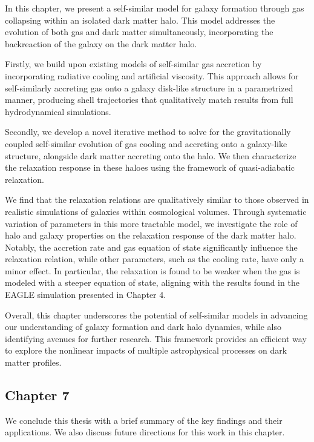 \documentclass[a4paper, 12pt, oneside]{Thesis}  %
\begin{document}
In this chapter, we present a self-similar model for galaxy formation through gas collapsing within an isolated dark matter halo. This model addresses the evolution of both gas and dark matter simultaneously, incorporating the backreaction of the galaxy on the dark matter halo.

Firstly, we build upon existing models of self-similar gas accretion by incorporating radiative cooling and artificial viscosity. This approach allows for self-similarly accreting gas onto a galaxy disk-like structure in a parametrized manner, producing shell trajectories that qualitatively match results from full hydrodynamical simulations.

Secondly, we develop a novel iterative method to solve for the gravitationally coupled self-similar evolution of gas cooling and accreting onto a galaxy-like structure, alongside dark matter accreting onto the halo. We then characterize the relaxation response in these haloes using the framework of quasi-adiabatic relaxation.

We find that the relaxation relations are qualitatively similar to those observed in realistic simulations of galaxies within cosmological volumes. Through systematic variation of parameters in this more tractable model, we investigate the role of halo and galaxy properties on the relaxation response of the dark matter halo. Notably, the accretion rate and gas equation of state significantly influence the relaxation relation, while other parameters, such as the cooling rate, have only a minor effect. In particular, the relaxation is found to be weaker when the gas is modeled with a steeper equation of state, aligning with the results found in the EAGLE simulation presented in Chapter 4.

Overall, this chapter underscores the potential of self-similar models in advancing our understanding of galaxy formation and dark halo dynamics, while also identifying avenues for further research. This framework provides an efficient way to explore the nonlinear impacts of multiple astrophysical processes on dark matter profiles.


\subsection*{Chapter 7}

We conclude this thesis with a brief summary of the key findings and their applications. We also discuss future directions for this work in this chapter.
\end{document}

